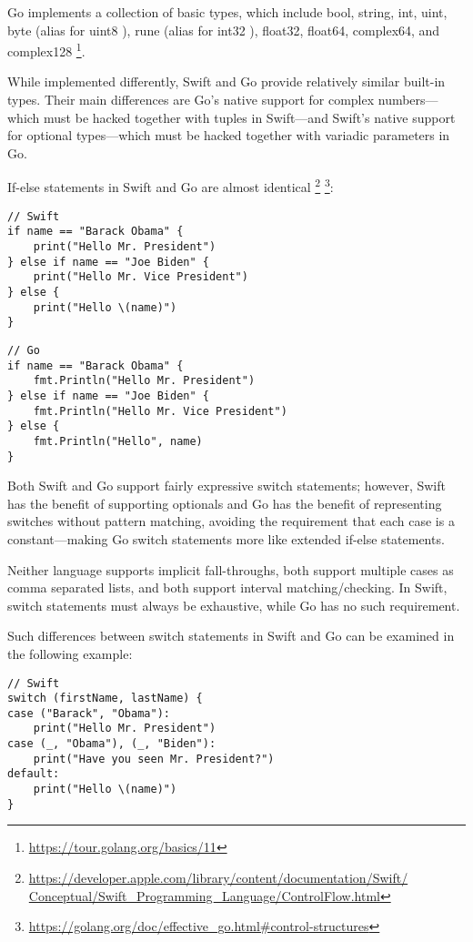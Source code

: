 \documentclass[letterpaper]{article}
\begin{document}
Go implements a collection of basic types, which include bool, string, int, uint, byte (alias for uint8 ), rune (alias for int32 ), float32, float64, complex64, and complex128 \footnote{\url{https://tour.golang.org/basics/11}}.

While implemented differently, Swift and Go provide relatively similar built-in types. Their main differences are Go’s native support for complex numbers—which must be hacked together with tuples in Swift—and Swift’s native support for optional types—which must be hacked together with variadic parameters in Go.

If-else statements in Swift and Go are almost identical \footnote{\url{https://developer.apple.com/library/content/documentation/Swift/ Conceptual/Swift_Programming_Language/ControlFlow.html}} \footnote{\url{https://golang.org/doc/effective_go.html#control-structures}}:

\begin{verbatim}
// Swift
if name == "Barack Obama" {
    print("Hello Mr. President")
} else if name == "Joe Biden" {
    print("Hello Mr. Vice President")
} else {
    print("Hello \(name)")
}
\end{verbatim}

\begin{verbatim}
// Go
if name == "Barack Obama" {
    fmt.Println("Hello Mr. President")
} else if name == "Joe Biden" {
    fmt.Println("Hello Mr. Vice President")
} else {
    fmt.Println("Hello", name)
}
\end{verbatim}

Both Swift and Go support fairly expressive switch statements; however, Swift has the benefit of supporting optionals and Go has the benefit of representing switches without pattern matching, avoiding the requirement that each case is a constant—making Go switch statements more like extended if-else statements.

Neither language supports implicit fall-throughs, both support multiple cases as comma separated lists, and both support interval matching/checking. In Swift, switch statements must always be exhaustive, while Go has no such requirement.

Such differences between switch statements in Swift and Go can be examined in the following example:

\begin{verbatim}
// Swift
switch (firstName, lastName) {
case ("Barack", "Obama"):
    print("Hello Mr. President")
case (_, "Obama"), (_, "Biden"):
    print("Have you seen Mr. President?")
default:
    print("Hello \(name)")
}
\end{verbatim}
\end{document}
